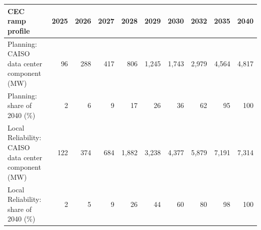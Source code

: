 \begin{tabular}{lrrrrrrrrr}
\toprule
CEC ramp profile & 2025 & 2026 & 2027 & 2028 & 2029 & 2030 & 2032 & 2035 & 2040 \\
\midrule
Planning: CAISO data center component (MW) & 96 & 288 & 417 & 806 & 1,245 & 1,743 & 2,979 & 4,564 & 4,817 \\
Planning: share of 2040 (\%) & 2 & 6 & 9 & 17 & 26 & 36 & 62 & 95 & 100 \\
Local Reliability: CAISO data center component (MW) & 122 & 374 & 684 & 1,882 & 3,238 & 4,377 & 5,879 & 7,191 & 7,314 \\
Local Reliability: share of 2040 (\%) & 2 & 5 & 9 & 26 & 44 & 60 & 80 & 98 & 100 \\
\bottomrule
\end{tabular}